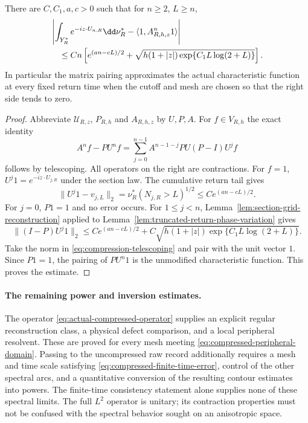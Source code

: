 \begin{proposition}
\label{prop:compressed-finite-time-comparison}
There are $C,C_1,a,c>0$ such that for $n\ge2$, $L\ge n$,
\begin{align}
 &\left|\int_{Y_R^*}e^{-iz\cdot U_{n,R}}\dd\nu_R^*
             -\langle1,A_{R,h,z}^n1\rangle\right|\notag\\
 &\quad\le Cn\left[
       e^{(an-cL)/2}
       +\sqrt{h(1+|z|)\exp\{C_1L\log(2+L)\}}
                    \right].
                 \label{eq:compressed-finite-time-error}
\end{align}
In particular the matrix pairing approximates the actual characteristic
function at every fixed return time when the cutoff and mesh are
chosen so that the right side tends to zero.
\end{proposition}
\begin{proof}
Abbreviate $\mathcal U_{R,z}$, $P_{R,h}$ and $A_{R,h,z}$ by $U,P,A$.
For $f\in V_{R,h}$ the exact identity
\begin{equation}\label{eq:compression-telescoping}
 A^nf-PU^nf=\sum_{j=0}^{n-1}A^{n-1-j}PU(P-I)U^jf
\end{equation}
follows by telescoping. All operators on the right are contractions.
For $f=1$, $U^j1=e^{-iz\cdot U_{j,R}}$ under the section law.
The cumulative return tail gives
\[
 \|U^j1-v_{j,L}\|_2
       =\nu_R^*(N_{j,R}>L)^{1/2}\le C e^{(an-cL)/2}.
\]
For $j=0$, $P1=1$ and no error occurs. For $1\le j<n$,
Lemma~\ref{lem:section-grid-reconstruction} applied to
Lemma~\ref{lem:truncated-return-phase-variation} gives
\[
 \|(I-P)U^j1\|_2\le C e^{(an-cL)/2}
       +C\sqrt{h(1+|z|)\exp\{C_1L\log(2+L)\}}.
\]
Take the norm in \eqref{eq:compression-telescoping} and pair with the
unit vector $1$. Since $P1=1$, the pairing of $PU^n1$ is the
unmodified characteristic function. This proves the estimate.
\end{proof}

\paragraph{The remaining power and inversion estimates.}
The operator \eqref{eq:actual-compressed-operator} supplies an explicit
regular reconstruction class, a physical defect comparison, and a
local peripheral resolvent. These are proved for every mesh meeting
\eqref{eq:compressed-peripheral-domain}. Passing to the uncompressed
raw record additionally requires a mesh and time scale satisfying
\eqref{eq:compressed-finite-time-error}, control of the other spectral
arcs, and a quantitative conversion of the resulting contour estimates
into powers. The finite-time consistency statement alone supplies
none of these spectral limits. The full $L^2$ operator is unitary;
its contraction properties must not be confused with the spectral
behavior sought on an anisotropic space.

